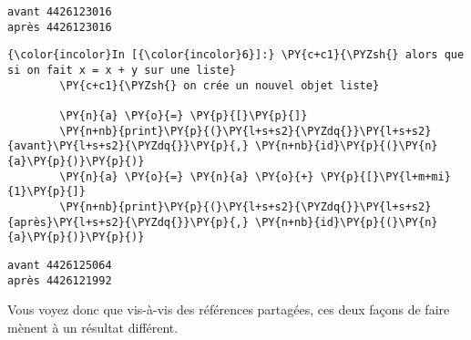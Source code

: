     \begin{Verbatim}[commandchars=\\\{\},frame=single,framerule=0.3mm,rulecolor=\color{cellframecolor}]
avant 4426123016
après 4426123016
\end{Verbatim}

    \begin{Verbatim}[commandchars=\\\{\},frame=single,framerule=0.3mm,rulecolor=\color{cellframecolor}]
{\color{incolor}In [{\color{incolor}6}]:} \PY{c+c1}{\PYZsh{} alors que si on fait x = x + y sur une liste}
        \PY{c+c1}{\PYZsh{} on crée un nouvel objet liste}
        
        \PY{n}{a} \PY{o}{=} \PY{p}{[}\PY{p}{]}
        \PY{n+nb}{print}\PY{p}{(}\PY{l+s+s2}{\PYZdq{}}\PY{l+s+s2}{avant}\PY{l+s+s2}{\PYZdq{}}\PY{p}{,} \PY{n+nb}{id}\PY{p}{(}\PY{n}{a}\PY{p}{)}\PY{p}{)}
        \PY{n}{a} \PY{o}{=} \PY{n}{a} \PY{o}{+} \PY{p}{[}\PY{l+m+mi}{1}\PY{p}{]}
        \PY{n+nb}{print}\PY{p}{(}\PY{l+s+s2}{\PYZdq{}}\PY{l+s+s2}{après}\PY{l+s+s2}{\PYZdq{}}\PY{p}{,} \PY{n+nb}{id}\PY{p}{(}\PY{n}{a}\PY{p}{)}\PY{p}{)}
\end{Verbatim}


    \begin{Verbatim}[commandchars=\\\{\},frame=single,framerule=0.3mm,rulecolor=\color{cellframecolor}]
avant 4426125064
après 4426121992
\end{Verbatim}

    Vous voyez donc que vis-à-vis des références partagées, ces deux façons
de faire mènent à un résultat différent.


    
    
    
